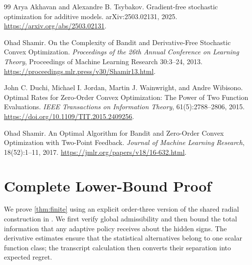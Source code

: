 \documentclass[11pt,a4paper]{article}
\theoremstyle{definition}
\theoremstyle{remark}
\begin{document}
\begin{thebibliography}{99}
Arya Akhavan and Alexandre B. Tsybakov.
\newblock Gradient-free stochastic optimization for additive models.
\newblock arXiv:2503.02131, 2025.
\newblock \url{https://arxiv.org/abs/2503.02131}.

Ohad Shamir.
\newblock On the Complexity of Bandit and Derivative-Free Stochastic Convex Optimization.
\newblock \emph{Proceedings of the 26th Annual Conference on Learning Theory},
Proceedings of Machine Learning Research 30:3--24, 2013.
\newblock \url{https://proceedings.mlr.press/v30/Shamir13.html}.

John C. Duchi, Michael I. Jordan, Martin J. Wainwright, and Andre Wibisono.
\newblock Optimal Rates for Zero-Order Convex Optimization: The Power of Two Function Evaluations.
\newblock \emph{IEEE Transactions on Information Theory}, 61(5):2788--2806, 2015.
\newblock \url{https://doi.org/10.1109/TIT.2015.2409256}.

Ohad Shamir.
\newblock An Optimal Algorithm for Bandit and Zero-Order Convex Optimization with Two-Point Feedback.
\newblock \emph{Journal of Machine Learning Research}, 18(52):1--11, 2017.
\newblock \url{https://jmlr.org/papers/v18/16-632.html}.

\end{thebibliography}
\clearpage
\appendix
\section{Complete Lower-Bound Proof}
\label{app:lower}
We prove \cref{thm:finite} using an explicit order-three version of the shared radial construction in \cite{Zhang2026,Loginov2026}. We first verify global admissibility and then bound the total information that any adaptive policy receives about the hidden signs. The derivative estimates ensure that the statistical alternatives belong to one scalar function class; the transcript calculation then converts their separation into expected regret.
\end{document}
